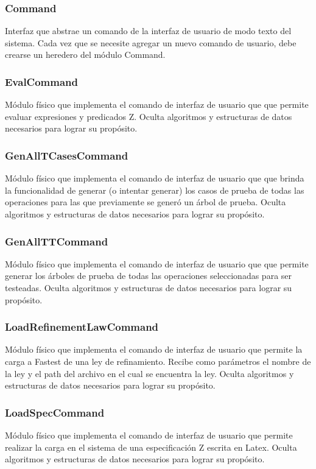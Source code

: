 \documentclass[a4paper,10pt]{report}
\begin{document}
			\subsubsection{Command}
			Interfaz que abstrae un comando de la interfaz de usuario de modo texto del sistema. Cada vez que se necesite agregar un nuevo comando de usuario, debe crearse un heredero del módulo Command.
			\subsubsection{EvalCommand}
			Módulo físico que implementa el comando de interfaz de usuario que que permite evaluar expresiones y predicados Z. Oculta algoritmos y estructuras de datos necesarios para lograr su propósito.
			\subsubsection{GenAllTCasesCommand}
			Módulo físico que implementa el comando de interfaz de usuario que que brinda la funcionalidad de generar (o intentar generar) los casos de prueba de todas las operaciones para las que previamente se generó un árbol de prueba. Oculta algoritmos y estructuras de datos necesarios para lograr su propósito.
			\subsubsection{GenAllTTCommand}
			Módulo físico que implementa el comando de interfaz de usuario que que permite generar los árboles de prueba de todas las operaciones seleccionadas para ser testeadas. Oculta algoritmos y estructuras de datos necesarios para lograr su propósito.
			\subsubsection{LoadRefinementLawCommand}
			Módulo físico que implementa el comando de interfaz de usuario que permite la carga a Fastest de una ley de refinamiento. Recibe como parámetros el nombre de la ley y el path del archivo en el cual se encuentra la ley. Oculta algoritmos y estructuras de datos necesarios para lograr su propósito.
			\subsubsection{LoadSpecCommand}
			Módulo físico que implementa el comando de interfaz de usuario que permite realizar la carga en el sistema de una especificación Z escrita en Latex. Oculta algoritmos y estructuras de datos necesarios para lograr su propósito.
\end{document}
